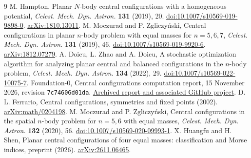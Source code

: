 \documentclass[10pt]{article}
\begin{document}
\begin{thebibliography}{9}
\setlength{\itemsep}{1pt}
 M. Hampton, Planar $N$-body central configurations with a homogeneous potential, \emph{Celest. Mech. Dyn. Astron.} \textbf{131} (2019), 20. \href{https://doi.org/10.1007/s10569-019-9898-0}{doi:10.1007/s10569-019-9898-0}. \href{https://arxiv.org/abs/1810.13011}{arXiv:1810.13011}.
 M. Moczurad and P. Zgliczyński, Central configurations in planar $n$-body problem with equal masses for $n=5,6,7$, \emph{Celest. Mech. Dyn. Astron.} \textbf{131} (2019), 46. \href{https://doi.org/10.1007/s10569-019-9920-6}{doi:10.1007/s10569-019-9920-6}. \href{https://arxiv.org/abs/1812.07279}{arXiv:1812.07279}.
 A. Doicu, L. Zhao and A. Doicu, A stochastic optimization algorithm for analyzing planar central and balanced configurations in the $n$-body problem, \emph{Celest. Mech. Dyn. Astron.} \textbf{134} (2022), 29. \href{https://doi.org/10.1007/s10569-022-10075-7}{doi:10.1007/s10569-022-10075-7}.
 Foundation-0, Central configurations computation report, 15 November 2026, revision \texttt{7c74606d01da}. \href{https://github.com/Foundation-0/f0/blob/7c74606d01da2b89b6fd5ef8710006842ad2b698/org/review/2026-11/science/threads/reports/cc.md}{Archived report and associated GitHub project}.
 D. L. Ferrario, Central configurations, symmetries and fixed points (2002). \href{https://arxiv.org/abs/math/0204198}{arXiv:math/0204198}.
 M. Moczurad and P. Zgliczyński, Central configurations in the spatial $n$-body problem for $n=5,6$ with equal masses, \emph{Celest. Mech. Dyn. Astron.} \textbf{132} (2020), 56. \href{https://doi.org/10.1007/s10569-020-09993-1}{doi:10.1007/s10569-020-09993-1}.
 X. Huangfu and H. Shen, Planar central configurations of four equal masses: classification and Morse indices, preprint (2026). \href{https://arxiv.org/abs/2611.06465}{arXiv:2611.06465}.
\end{thebibliography}
\end{document}
